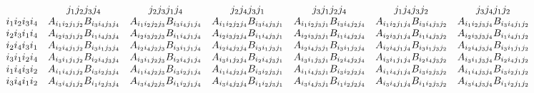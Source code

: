 \documentclass[aps,preprint]{revtex4}%
\begin{document}
\begin{equation}%
\begin{array}
[c]{ccccccc}
& j_{1}j_{2}j_{3}j_{4} & j_{2}j_{3}j_{1}j_{4} & j_{2}j_{4}j_{3}j_{1} &
j_{3}j_{1}j_{2}j_{4} & j_{1}j_{4}j_{3}j_{2} & j_{3}j_{4}j_{1}j_{2}\\
i_{1}i_{2}i_{3}i_{4} & A_{i_{1}i_{2}j_{1}j_{2}}B_{i_{3}i_{4}j_{3}j_{4}} &
A_{i_{1}i_{2}j_{2}j_{3}}B_{i_{3}i_{4}j_{1}j_{4}} & A_{i_{1}i_{2}j_{2}j_{4}%
}B_{i_{3}i_{4}j_{3}j_{1}} & A_{i_{1}i_{2}j_{3}j_{1}}B_{i_{3}i_{4}j_{2}j_{4}} &
A_{i_{1}i_{2}j_{1}j_{4}}B_{i_{3}i_{4}j_{3}j_{2}} & A_{i_{1}i_{2}j_{3}j_{4}%
}B_{i_{3}i_{4}j_{1}j_{2}}\\
i_{2}i_{3}i_{1}i_{4} & A_{i_{2}i_{3}j_{1}j_{2}}B_{i_{1}i_{4}j_{3}j_{4}} &
A_{i_{2}i_{3}j_{2}j_{3}}B_{i_{1}i_{4}j_{1}j_{4}} & A_{i_{2}i_{3}j_{2}j_{4}%
}B_{i_{1}i_{4}j_{3}j_{1}} & A_{i_{2}i_{3}j_{3}j_{1}}B_{i_{1}i_{4}j_{2}j_{4}} &
A_{i_{2}i_{3}j_{1}j_{4}}B_{i_{1}i_{4}j_{3}j_{2}} & A_{i_{2}i_{3}j_{3}j_{4}%
}B_{i_{1}i_{4}j_{1}j_{2}}\\
i_{2}i_{4}i_{3}i_{1} & A_{i_{2}i_{4}j_{1}j_{2}}B_{i_{3}i_{1}j_{3}j_{4}} &
A_{i_{2}i_{4}j_{2}j_{3}}B_{i_{3}i_{1}j_{1}j_{4}} & A_{i_{2}i_{4}j_{2}j_{4}%
}B_{i_{3}i_{1}j_{3}j_{1}} & A_{i_{2}i_{4}j_{3}j_{1}}B_{i_{3}i_{1}j_{2}j_{4}} &
A_{i_{2}i_{4}j_{1}j_{4}}B_{i_{3}i_{1}j_{3}j_{2}} & A_{i_{2}i_{4}j_{3}j_{4}%
}B_{i_{3}i_{1}j_{1}j_{2}}\\
i_{3}i_{1}i_{2}i_{4} & A_{i_{3}i_{1}j_{1}j_{2}}B_{i_{2}i_{4}j_{3}j_{4}} &
A_{i_{3}i_{1}j_{2}j_{3}}B_{i_{2}i_{4}j_{1}j_{4}} & A_{i_{3}i_{1}j_{2}j_{4}%
}B_{i_{2}i_{4}j_{3}j_{1}} & A_{i_{3}i_{1}j_{3}j_{1}}B_{i_{2}i_{4}j_{2}j_{4}} &
A_{i_{3}i_{1}j_{1}j_{4}}B_{i_{2}i_{4}j_{3}j_{2}} & A_{i_{3}i_{1}j_{3}j_{4}%
}B_{i_{2}i_{4}j_{1}j_{2}}\\
i_{1}i_{4}i_{3}i_{2} & A_{i_{1}i_{4}j_{1}j_{2}}B_{i_{3}i_{2}j_{3}j_{4}} &
A_{i_{1}i_{4}j_{2}j_{3}}B_{i_{3}i_{2}j_{1}j_{4}} & A_{i_{1}i_{4}j_{2}j_{4}%
}B_{i_{3}i_{2}j_{3}j_{1}} & A_{i_{1}i_{4}j_{3}j_{1}}B_{i_{3}i_{2}j_{2}j_{4}} &
A_{i_{1}i_{4}j_{1}j_{4}}B_{i_{3}i_{2}j_{3}j_{2}} & A_{i_{1}i_{4}j_{3}j_{4}%
}B_{i_{3}i_{2}j_{1}j_{2}}\\
i_{3}i_{4}i_{1}i_{2} & A_{i_{3}i_{4}j_{1}j_{2}}B_{i_{1}i_{2}j_{3}j_{4}} &
A_{i_{3}i_{4}j_{2}j_{3}}B_{i_{1}i_{2}j_{1}j_{4}} & A_{i_{3}i_{4}j_{2}j_{4}%
}B_{i_{1}i_{2}j_{3}j_{1}} & A_{i_{3}i_{4}j_{3}j_{1}}B_{i_{1}i_{2}j_{2}j_{4}} &
A_{i_{3}i_{4}j_{1}j_{4}}B_{i_{1}i_{2}j_{3}j_{2}} & A_{i_{3}i_{4}j_{3}j_{4}%
}B_{i_{1}i_{2}j_{1}j_{2}}%
\end{array}
\end{equation}
\end{document}
